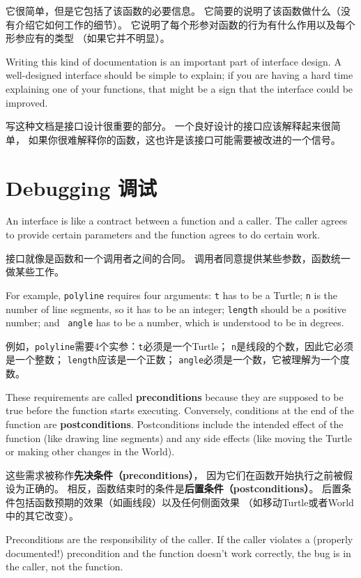 \documentclass[10pt]{book}
\begin{document}
\begin{CJK}{UTF8}{gbsn}
它很简单，但是它包括了该函数的必要信息。
它简要的说明了该函数做什么（没有介绍它如何工作的细节）。
它说明了每个形参对函数的行为有什么作用以及每个形参应有的类型
（如果它并不明显）。

Writing this kind of documentation is an important part of interface
design.  A well-designed interface should be simple to explain;
if you are having a hard time explaining one of your functions,
that might be a sign that the interface could be improved.

写这种文档是接口设计很重要的部分。
一个良好设计的接口应该解释起来很简单，
如果你很难解释你的函数，这也许是该接口可能需要被改进的一个信号。


\section{Debugging 调试}

An interface is like a contract between a function and a caller.
The caller agrees to provide certain parameters and the function
agrees to do certain work.

接口就像是函数和一个调用者之间的合同。
调用者同意提供某些参数，函数统一做某些工作。

For example, {\tt polyline} requires four arguments: {\tt t} has to be
a Turtle; {\tt n} is the number of line segments, so it has to be an
integer; {\tt length} should be a positive number; and {\tt
  angle} has to be a number, which is understood to be in degrees.
  
例如，{\tt polyline}需要4个实参：{\tt t}必须是一个Turtle；
{\tt n}是线段的个数，因此它必须是一个整数；
{\tt length}应该是一个正数；
{\tt angle}必须是一个数，它被理解为一个度数。

These requirements are called {\bf preconditions} because they
are supposed to be true before the function starts executing.
Conversely, conditions at the end of the function are
{\bf postconditions}.  Postconditions include the intended
effect of the function (like drawing line segments) and any
side effects (like moving the Turtle or making other changes
in the World).

这些需求被称作{\bf 先决条件（preconditions）}，
因为它们在函数开始执行之前被假设为正确的。
相反，函数结束时的条件是{\bf 后置条件（postconditions）}。
后置条件包括函数预期的效果（如画线段）以及任何侧面效果
（如移动Turtle或者World中的其它改变）。

Preconditions are the responsibility of the caller.  If the caller
violates a (properly documented!) precondition and the function
doesn't work correctly, the bug is in the caller, not the function.


\end{CJK}
\end{document}
